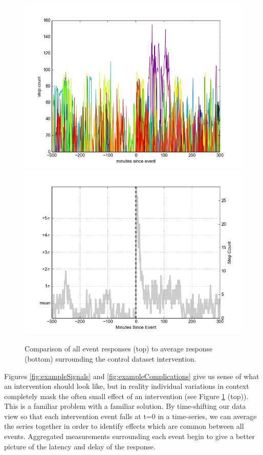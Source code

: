 \documentclass[review,journal]{vgtc}         %
\begin{document}
\begin{figure}
\centering
\includegraphics[width=0.9\columnwidth]{./img/perfect_intervention_individual_events.png}
\includegraphics[width=0.9\columnwidth]{./img/perfect_intervention.png}
\caption{Comparison of all event responses (top) to average response (bottom) surrounding the control dataset intervention.}
\label{fig:interventionAverage}
\end{figure}

Figures \ref{fig:exampleSignals} and \ref{fig:exampleComplications} give us sense of what an intervention should look like, but in reality individual variations in context completely mask the often small effect of an intervention (see Figure \ref{fig:interventionAverage} (top)).
This is a familiar problem with a familiar solution.
By time-shifting our data view so that each intervention event falls at t=0 in a time-series, we can average the series together in order to identify effects which are common between all events.
Aggregated measurements surrounding each event begin to give a better picture of the latency and delay of the response.
\end{document}
